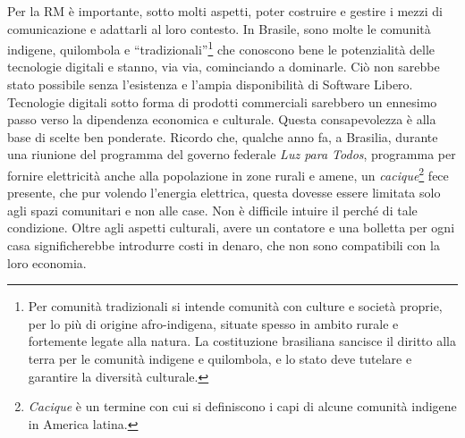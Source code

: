 Per la RM è importante, sotto molti aspetti, poter costruire e gestire
i mezzi di comunicazione e adattarli al loro contesto. In Brasile,
sono molte le comunità indigene, quilombola e
``tradizionali''\footnote{Per comunità tradizionali si intende
  comunità con culture e società proprie, per lo più di origine
  afro-indigena, situate spesso in ambito rurale e fortemente legate
  alla natura. La costituzione brasiliana sancisce il diritto alla
  terra per le comunità indigene e quilombola, e lo stato deve
  tutelare e garantire la diversità culturale.} che conoscono bene le
potenzialità delle tecnologie digitali e stanno, via via, cominciando
a dominarle. Ciò non sarebbe stato possibile senza l'esistenza e
l'ampia disponibilità di Software Libero. Tecnologie digitali sotto
forma di prodotti commerciali sarebbero un ennesimo passo verso la
dipendenza economica e culturale. Questa consapevolezza è alla base di
scelte ben ponderate. Ricordo che, qualche anno fa, a Brasilia,
durante una riunione del programma del governo federale \emph{Luz para
  Todos}, programma per fornire elettricità anche alla popolazione in
zone rurali e amene, un \emph{cacique}\footnote{ \emph{Cacique} è un
  termine con cui si definiscono i capi di alcune comunità indigene in
  America latina. } fece presente, che pur volendo l'energia
elettrica, questa dovesse essere limitata solo agli spazi comunitari e
non alle case. Non è difficile intuire il perché di tale
condizione. Oltre agli aspetti culturali, avere un contatore e una
bolletta per ogni casa significherebbe introdurre costi in denaro, che
non sono compatibili con la loro economia.


